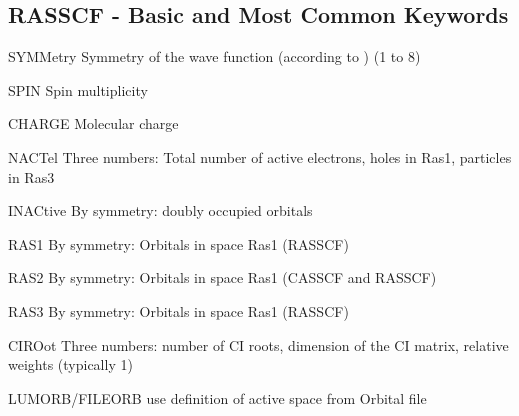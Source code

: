 \subsection{RASSCF - Basic and Most Common Keywords}
\begin{keywordlist}
\item[SYMMetry] Symmetry of the wave function (according to )
(1 to 8)
\item[SPIN] Spin multiplicity
\item[CHARGE] Molecular charge
\item[NACTel] Three numbers: Total number of active electrons, holes in Ras1, particles in Ras3
\item[INACtive] By symmetry: doubly occupied orbitals
\item[RAS1] By symmetry: Orbitals in space Ras1 (RASSCF)
\item[RAS2] By symmetry: Orbitals in space Ras1 (CASSCF and RASSCF)
\item[RAS3] By symmetry: Orbitals in space Ras1 (RASSCF)
\item[CIROot] Three numbers: number of CI roots, dimension of the CI matrix, relative weights
(typically 1)
\item[LUMORB/FILEORB] use definition of active space from Orbital file
\item[]
\end{keywordlist}

